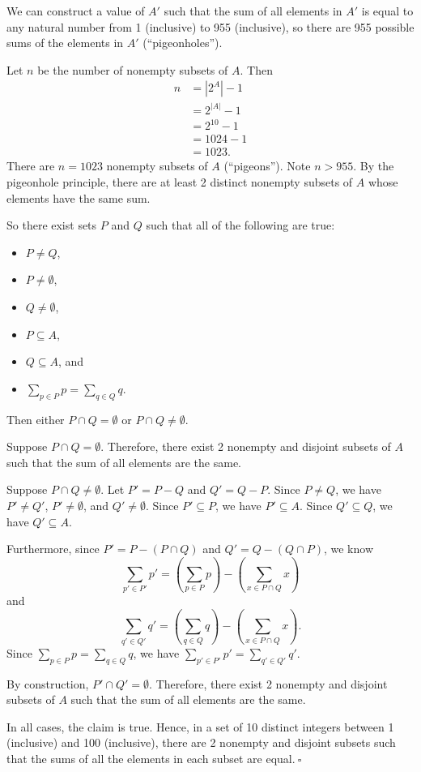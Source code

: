 \documentclass{article}
\theoremstyle{definition}
\begin{document}
\begin{solution}
\begin{enumerate}
We can construct a value of $A'$ such that the sum of all elements in $A'$ is equal to any natural number from 1 (inclusive) to 955 (inclusive), so there are 955 possible sums of the elements in $A'$ (``pigeonholes'').

Let $n$ be the number of nonempty subsets of $A$. Then
\begin{align*}
n
&=\left|2^A\right|-1\\
&=2^{|A|}-1\\
&=2^{10}-1\\
&=1024-1\\
&=1023.
\end{align*}
There are $n=1023$ nonempty subsets of $A$ (``pigeons''). Note $n>955$. By the pigeonhole principle, there are at least 2 distinct nonempty subsets of $A$ whose elements have the same sum.

So there exist sets $P$ and $Q$ such that all of the following are true:
\begin{itemize}
    \item$P\neq Q$,
    \item$P\neq\emptyset$,
    \item$Q\neq\emptyset$,
    \item$P\subseteq A$,
    \item$Q\subseteq A$, and
    \item$\sum_{p\in P}{p}=\sum_{q\in Q}{q}.$
\end{itemize}
Then either $P\cap Q=\emptyset$ or $P\cap Q\neq\emptyset$.

Suppose $P\cap Q=\emptyset$. Therefore, there exist 2 nonempty and disjoint subsets of $A$ such that the sum of all elements are the same.

Suppose $P\cap Q\neq\emptyset$. Let $P'=P-Q$ and $Q'=Q-P$. Since $P\neq Q$, we have $P'\neq Q'$, $P'\neq\emptyset$, and $Q'\neq\emptyset$. Since $P'\subseteq P$, we have $P'\subseteq A$. Since $Q'\subseteq Q$, we have $Q'\subseteq A$.

Furthermore, since $P'=P-(P\cap Q)$ and $Q'=Q-(Q\cap P)$, we know \[\sum_{p'\in P'}{p'}=\left(\sum_{p\in P}{p}\right)-\left(\sum_{x\in P\cap Q}{x}\right)\] and \[\sum_{q'\in Q'}{q'}=\left(\sum_{q\in Q}{q}\right)-\left(\sum_{x\in P\cap Q}{x}\right).\] Since $\sum_{p\in P}{p}=\sum_{q\in Q}{q}$, we have $\sum_{p'\in P'}{p'}=\sum_{q'\in Q'}{q'}$.

By construction, $P'\cap Q'=\emptyset$. Therefore, there exist 2 nonempty and disjoint subsets of $A$ such that the sum of all elements are the same.

In all cases, the claim is true. Hence, in a set of 10 distinct integers between 1 (inclusive) and 100 (inclusive), there are 2 nonempty and disjoint subsets such that the sums of all the elements in each subset are equal.$~\square$
\end{enumerate}
\end{solution}
\end{document}

